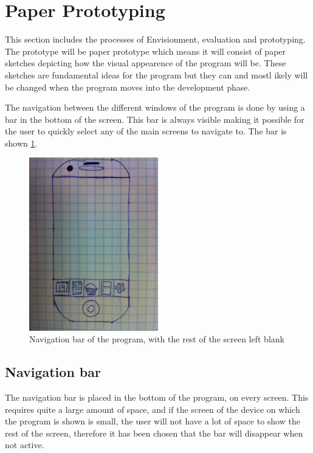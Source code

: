 \section{Paper Prototyping}\label{Sketches}
This section includes the processes of Envisionment, evaluation and prototyping. The prototype will be paper prototype which means it will consist of paper sketches depicting how the visual appearence of the program will be. These sketches are fundamental ideas for the program but they can and mostl ikely will be changed when the program moves into the development phase.

The navigation between the different windows of the program is done by using a bar in the bottom of the screen. This bar is always visible making it possible for the user to quickly select any of the main screens to navigate to. The bar is shown \cref{NavigationBarSketch}.

\begin{figure}[H]
	\centering
    \includegraphics[width=0.5\textwidth]{Grafik/FoodPlanner/NavigationBarSketch}
	\caption{Navigation bar of the program, with the rest of the screen left blank}
	\label{NavigationBarSketch}
\end{figure}

\subsection{Navigation bar}

The navigation bar is placed in the bottom of the program, on every screen. This requires quite a large amount of space, and if the screen of the device on which the program is shown is small, the user will not have a lot of space to show the rest of the screen, therefore it has been chosen that the bar will disappear when not active.

